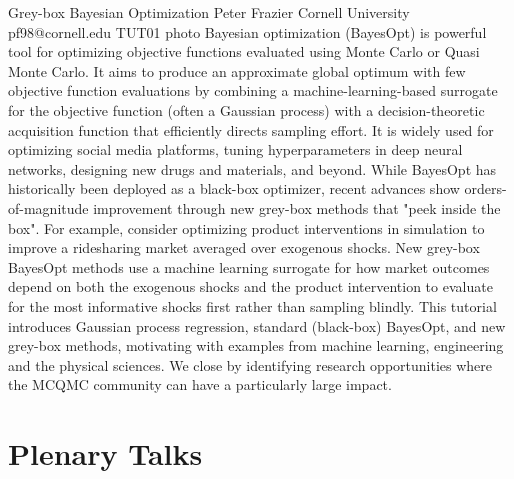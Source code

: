 \documentclass[12pt,a4paper,figuresright]{book}
\begin{document}
\begin{talk}
 {Grey-box Bayesian Optimization}%
 {Peter Frazier}%
 {Cornell University}%
 {pf98@cornell.edu}%
 {}%
 {}%
 {}%
 {TUT01}%
 {photo}%
Bayesian optimization (BayesOpt) is powerful tool for optimizing objective functions evaluated using Monte Carlo or Quasi Monte Carlo. It aims to produce an approximate global optimum with few objective function evaluations by combining a machine-learning-based surrogate for the objective function (often a Gaussian process) with a decision-theoretic acquisition function that efficiently directs sampling effort.  It is widely used for optimizing social media platforms, tuning hyperparameters in deep neural networks, designing new drugs and materials, and beyond. While BayesOpt has historically been deployed as a black-box optimizer, recent advances show orders-of-magnitude improvement through new grey-box methods that "peek inside the box".  For example, consider optimizing product interventions in simulation to improve a ridesharing market averaged over exogenous shocks. New grey-box BayesOpt methods use a machine learning surrogate for how market outcomes depend on both the exogenous shocks and the product intervention to evaluate for the most informative shocks first rather than sampling blindly. This tutorial introduces Gaussian process regression, standard (black-box) BayesOpt, and new grey-box methods, motivating with examples from machine learning, engineering and the physical sciences. We close by identifying research opportunities where the MCQMC community can have a particularly large impact.

\end{talk}

\clearpage

\chapter{Plenary Talks}
\newpage
\end{document}
